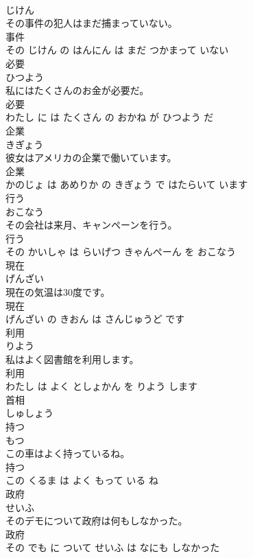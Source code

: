 \documentclass[8pt]{extreport}
\begin{document}
\begin{CJK}{UTF8}{min}
\\	じけん			
\\	その事件の犯人はまだ捕まっていない。	
\\	事件 
\\	その じけん の はんにん は まだ つかまって いない			
\\	必要	
\\	ひつよう			
\\	私にはたくさんのお金が必要だ。	
\\	必要 
\\	わたし に は たくさん の おかね が ひつよう だ			
\\	企業	
\\	きぎょう			
\\	彼女はアメリカの企業で働いています。	
\\	企業 
\\	かのじょ は あめりか の きぎょう で はたらいて います			
\\	行う	
\\	おこなう			
\\	その会社は来月、キャンペーンを行う。	
\\	行う 
\\	その かいしゃ は らいげつ きゃんぺーん を おこなう			
\\	現在	
\\	げんざい			
\\	現在の気温は30度です。	
\\	現在 
\\	げんざい の きおん は さんじゅうど です			
\\	利用	
\\	りよう			
\\	私はよく図書館を利用します。	
\\	利用 
\\	わたし は よく としょかん を りよう します			
\\	首相	
\\	しゅしょう			
\\	持つ	
\\	もつ			
\\	この車はよく持っているね。	
\\	持つ 
\\	この くるま は よく もって いる ね			
\\	政府	
\\	せいふ			
\\	そのデモについて政府は何もしなかった。	
\\	政府 
\\	その でも に ついて せいふ は なにも しなかった			

\end{CJK}
\end{document}
